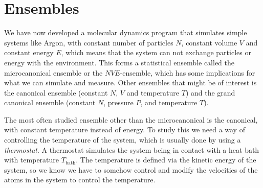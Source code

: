 \chapter{Ensembles\label{chap:ensembles}}
%
%
%
%
We have now developed a molecular dynamics program that simulates simple systems like Argon, with constant number of particles $N$, constant volume $V$ and constant energy $E$, which means that the system can not exchange particles or energy with the environment. This forms a statistical ensemble called the microcanonical ensemble or the $NVE$-ensemble, which has some implications for what we can simulate and measure. Other ensembles that might be of interest is the canonical ensemble (constant $N$, $V$ and temperature $T$) and the grand canonical ensemble (constant $N$, pressure $P$, and temperature $T$).


The most often studied ensemble other than the microcanonical is the canonical, with constant temperature instead of energy. To study this we need a way of controlling the temperature of the system, which is usually done by using a \emph{thermostat}. A thermostat simulates the system being in contact with a heat bath with temperature $T_\text{bath}$. The temperature is defined via the kinetic energy of the system, so we know we have to somehow control and modify the velocities of the atoms in the system to control the temperature.
% 
